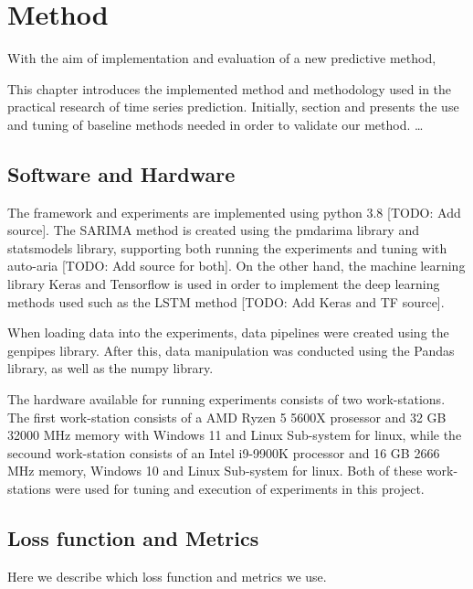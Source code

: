 \chapter{Method}
\label{section:Method}

With the aim of implementation and evaluation of a new predictive method,

This chapter introduces the implemented method and methodology used in the practical research of time series prediction.
Initially, section  and  presents the use and tuning of baseline methods needed in order to validate our method.
\dots

\section{Software and Hardware}

The framework and experiments are implemented using python 3.8 [TODO: Add source].
The SARIMA method is created using the pmdarima library and statsmodels library,
supporting both running the experiments and tuning with auto-aria [TODO: Add source for both].
On the other hand, the machine learning library Keras and Tensorflow is used in order to implement the deep learning methods used such as the LSTM method [TODO: Add Keras and TF source].

When loading data into the experiments, data pipelines were created using the genpipes library.
After this, data manipulation was conducted using the Pandas library, as well as the numpy library.


The hardware available for running experiments consists of two work-stations.
The first work-station consists of a AMD Ryzen 5 5600X prosessor and 32 GB 32000 MHz memory with Windows 11 and Linux Sub-system for linux,
while the secound work-station consists of an Intel i9-9900K processor and 16 GB 2666 MHz memory, Windows 10 and Linux Sub-system for linux.
Both of these work-stations were used for tuning and execution of experiments in this project.

\section{Loss function and Metrics}
Here we describe which loss function and metrics we use.

